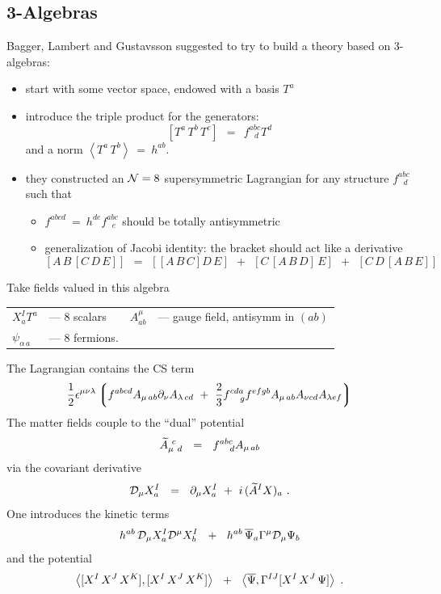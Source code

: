 \documentclass[12pt]{article}
\begin{document}
\subsection{3-Algebras}

Bagger, Lambert \cite{BL} and Gustavsson \cite{Gus} suggested to try to build a theory based
on 3-algebras:
\begin{itemize}
\item
	start with some vector space, endowed with a basis $ T^a $
\item
	introduce the triple product for the generators:
\[
	[ T^a\, T^b\, T^c ] ~~=~~ f^{abc}_{\ \ \ d} T^d
\]
	and a norm $ \left\langle T^a \, T^b \right\rangle ~=~ h^{ab} $.
\item
	they constructed an $ \mathcal{N}=8 $ supersymmetric Lagrangian for any structure $ f^{abc}_{\ \ \ d} $ such that
\begin{itemize}
	\item
	$ f^{abcd} ~=~ h^{de} f^{abc}_{\ \ \ e} $ should be totally antisymmetric
	\item
	generalization of Jacobi identity: the bracket should act like a derivative
\[
	\left[ A\, B \, \left[ C\, D \, E \right]\right] ~~=~~
	\left[ \left[ A\, B \, C \right] D\, E \right] ~~+~~ \left[ C\, \left[ A\, B\, D \right] \, E \right] 
	~~+~~
	\left[ C\, D\, \left[ A\, B\, E \right] \right] 
\]
\end{itemize}
\end{itemize}
Take fields valued in this algebra
\begin{center}
\begin{tabular}{llll}
   $ X_a^I T^a $  & --- 8 scalars &  \qquad\qquad $ A^\mu_{ab} $ & --- gauge field, antisymm in $(ab)$ \\
   $ \psi_{\alpha\, a} $  & --- 8 fermions.
\end{tabular}
\end{center}
The Lagrangian contains the CS term
\[
	\frac{1}{2} \epsilon^{\mu\nu\lambda} 
		\left\lgroup f^{abcd} A_{\mu\,ab} \partial_\nu A_{\lambda\, cd} ~+~
			\frac{2}{3} f^{cda}_{\ \ \ g} f^{efgb} A_{\mu\, ab} A_{\nu cd} A_{\lambda ef} \right\rgroup
\]
The matter fields couple to the ``dual'' potential
\[
	\widetilde{A}{}_{\mu\ d}^{\ c} ~~=~~ f^{abc}_{\ \ \ d} A_{\mu\, ab}
\]
via the covariant derivative
\[
	\mathcal{D}_\mu X_a^I ~~=~~ \partial_\mu X_a^I ~+~  i\, (\widetilde{A}{}^{I} X)_a~.
\]
One introduces the kinetic terms 
\[
	h^{ab}\, \mathcal{D}_\mu X_a^I \mathcal{D}^\mu X^I_b  ~~+~~ h^{ab}\, \overline{\Psi}{}_a \Gamma^\mu \mathcal{D}_\mu \Psi_b
\]
and the potential 
\[
	\left\langle [X^I\, X^J\, X^K ] , [X^I\, X^J\, X^K ] \right\rangle ~~+~~
	\left\langle \overline{\Psi}, \Gamma^{IJ} [ X^I\, X^J \, \Psi ] \right \rangle~.
\]
\end{document}
